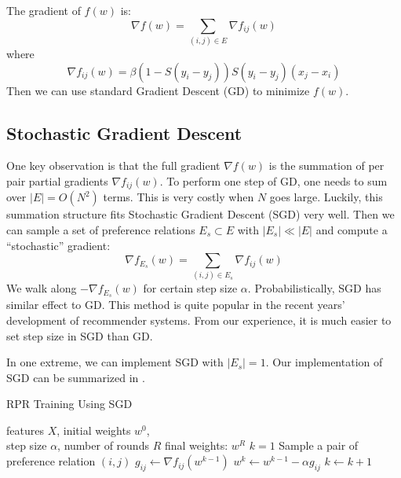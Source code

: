 \documentclass{sig-alternate}
\begin{document}
The gradient of $f(w)$ is: 
\begin{equation}
	\nabla f(w) = \sum_{(i,j) \in E} \nabla f_{ij}(w) 
\end{equation}
where
\begin{equation}
	\nabla f_{ij}(w) = \beta (1-S(y_i - y_j))S(y_i-y_j)(x_j-x_i)
\end{equation}
Then we can use standard Gradient Descent (GD) to minimize $f(w)$. 

\subsection{Stochastic Gradient Descent}
\label{sec:Stochastic Gradient Descent}

One key observation is that the full gradient $\nabla f(w)$ 
is the summation of per pair partial gradients $\nabla f_{ij}(w)$. 
To perform one step of GD, one needs to sum over $|E| = O(N^2)$ terms.
This is very costly when $N$ goes large. 
Luckily, this summation structure fits Stochastic Gradient Descent (SGD) \cite{wiki_sgd} very well. 
Then we can sample a set of preference relations $E_s \subset E$ 
with $ |E_s| \ll |E| $
and compute a ``stochastic'' gradient:
\begin{equation}
	\nabla f_{E_s}(w) = \sum_{(i,j) \in E_s} \nabla f_{ij}(w) 
\end{equation}
We walk along $-\nabla f_{E_s}(w)$ for certain step size $\alpha$. 
Probabilistically, SGD has similar effect to GD. 
This method is quite popular in the recent years' development of recommender systems. 
From our experience, it is much easier to set step size in SGD than GD. 

In one extreme, we can implement SGD with $|E_s| = 1$. 
Our implementation of SGD can be summarized in \ralg{\ref{alg:rpr_sgd}}. 

\begin{algorithm}[htb]
	\caption{RPR Training Using SGD}
	\label{alg:rpr_sgd}
	\begin{algorithmic}[1]
		\REQUIRE features $X$, initial weights $w^0$, 
		\\ step size $\alpha$, number of rounds $R$
		\ENSURE final weights: $w^{R}$ 
		\STATE $k=1$
		\STATE Sample a pair of preference relation $(i,j)$ 
		\STATE $g_{ij} \leftarrow \nabla f_{ij}(w^{k-1})$
		\STATE $w^{k} \leftarrow w^{k-1} - \alpha g_{ij}$
		\STATE $k \leftarrow k + 1$
		\ENDWHILE
	\end{algorithmic}
\end{algorithm}
\end{document}
